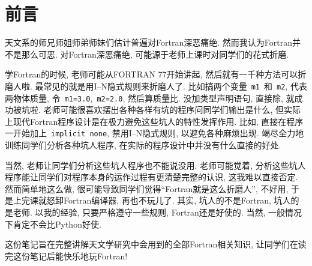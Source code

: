 \chapter*{前言}

天文系的师兄师姐师弟师妹们估计普遍对Fortran深恶痛绝. 然而我认为Fortran并不是那么可恶. 对Fortran深恶痛绝, 可能源于老师上课时对同学们的花式折磨.

学Fortran的时候, 老师可能从FORTRAN 77开始讲起, 然后就有一千种方法可以折磨人啦. 最常见的就是用I--N隐式规则来折磨人了. 比如搞两个变量~\verb|m1|~和~\verb|m2|, 代表两物体质量, 令~\verb|m1=3.0|,~\verb|m2=2.0|, 然后算质量比. 没加类型声明语句, 直接除, 就成功被坑啦. 老师可能很喜欢摆出各种各样有坑的程序问同学们输出是什么, 但实际上现代Fortran程序设计是在极力避免这些坑人的特性发挥作用. 比如, 直接在程序一开始加上~\verb|implicit none|, 禁用I--N隐式规则, 以避免各种麻烦出现. 竭尽全力地训练同学们分析各种坑人程序, 在实际的程序设计中并没有什么直接的好处.

当然, 老师让同学们分析这些坑人程序也不能说没用. 老师可能觉着, 分析这些坑人程序能让同学们对程序本身的运作过程有更清楚完整的认识, 这我难以直接否定. 然而简单地这么做, 很可能导致同学们觉得``Fortran就是这么折磨人'', 不好用, 于是上完课就怒卸Fortran编译器, 再也不玩儿了. 其实, 坑人的不是Fortran, 坑人的是老师. 以我的经验, 只要严格遵守一些规则, Fortran还是好使的. 当然, 一般情况下肯定不会比Python好使.

这份笔记旨在完整讲解天文学研究中会用到的全部Fortran相关知识, 让同学们在读完这份笔记后能快乐地玩Fortran!
